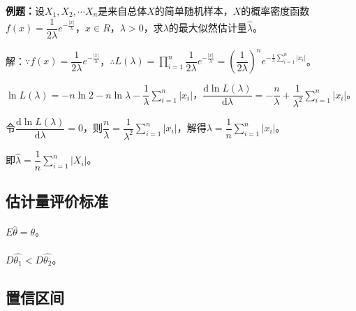 \textbf{例题：}设$X_1,X_2,\cdots X_n$是来自总体$X$的简单随机样本，$X$的概率密度函数$f(x)=\dfrac{1}{2\lambda}e^{-\frac{\vert x\vert}{\lambda}}$，$x\in R$，$\lambda>0$，求$\lambda$的最大似然估计量$\hat{\lambda}$。

解：$\because f(x)=\dfrac{1}{2\lambda}e^{-\frac{\vert x\vert}{\lambda}}$，$\therefore L(\lambda)=\prod\limits_{i=1}^n\dfrac{1}{2\lambda}e^{-\frac{\vert x\vert}{\lambda}}=\left(\dfrac{1}{2\lambda}\right)^ne^{-\frac{1}{\lambda}\sum\limits_{i=1}^n\vert x_i\vert}$。

$\ln L(\lambda)=-n\ln2-n\ln\lambda-\dfrac{1}{\lambda}\sum\limits_{i=1}^n\vert x_i\vert$，$\dfrac{\textrm{d}\ln L(\lambda)}{\textrm{d}\lambda}=-\dfrac{n}{\lambda}+\dfrac{1}{\lambda^2}\sum\limits_{i=1}^n\vert x_i\vert$。

令$\dfrac{\textrm{d}\ln L(\lambda)}{\textrm{d}\lambda}=0$，则$\dfrac{n}{\lambda}=\dfrac{1}{\lambda^2}\sum\limits_{i=1}^n\vert x_i\vert$，解得$\lambda=\dfrac{1}{n}\sum\limits_{i=1}^n\vert x_i\vert$。

即$\hat{\lambda}=\dfrac{1}{n}\sum\limits_{i=1}^n\vert X_i\vert$。

\subsection{估计量评价标准}

\paragraph{}

$E\hat{\theta}=\theta$。

\paragraph{}

$D\hat{\theta_1}<D\hat{\theta_2}$。

\paragraph{}

\subsection{置信区间}

\paragraph{}

